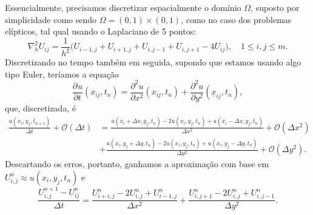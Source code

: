 \documentclass[../differential_methods.tex]{subfiles}
\begin{document}
Essencialmente, precisamos discretizar espacialmente o domínio \(\Omega \), suposto por simplicidade como sendo \(\Omega = (0, 1) \times (0, 1)\), como no caso dos problemas elípticos, tal qual usando o Laplaciano de 5 pontos:
\[
	\nabla_{h}^{2} U_{ij} = \frac{1}{h^{2}}\biggl(U_{i-1, j} + U_{i+1, j} + U_{i, j-1} + U_{i, j+1} - 4U_{ij}\biggr), \quad 1\leq i, j\leq m.
\]
Discretizando no tempo também em seguida, supondo que estamos usando algo tipo Euler, teríamos a equação
\[
	\frac{\partial^{}u}{\partial t^{}}(x_{ij}, t_{n}) = \frac{\partial^{2}u}{\partial x^{2}}(x_{ij}, t_{n}) + \frac{\partial^{2}u}{\partial y^{2}}(\underline{x}_{ij}, t_{n}),
\]
que, discretizada, é
\begin{align*}
	\frac{u(x_{i}, y_{j}, t_{n+1})}{\Delta t} + \mathcal{O}(\Delta t) & = \frac{u(x_{i}+\Delta x, y_{j}, t_{n}) - 2u(x_{i}, y_{j}, t_{n}) + u(x_{i}-\Delta x, y_{j}, t_{n}) }{\Delta x^{2}} + \mathcal{O}(\Delta x^{2}) \\
	                                                                  & + \frac{u(x_{i}, y_{j}+\Delta y, t_{n}) - 2u(x_{i}, y_{j}, t_{n}) + u(x_{i}, y_{j}-\Delta y, t_{n})}{\Delta y^{2}} + \mathcal{O}(\Delta y^{2}).
\end{align*}
Descartando os erros, portanto, ganhamos a aproximação com base em \(U_{i,j}^{n}\approx u(x_{i}, y_{j}, t_{n})\) e
\[
	\boxed{\frac{U_{i,j}^{n+1}-U_{ij}^{n}}{\Delta t} = \frac{U_{i+i, j}^{n} -2U_{i, j}^{n} + U_{i-1, j}^{n}}{\Delta x^{2}}+ \frac{U_{i, j+1}^{n} - 2U_{i, j}^{n} + U_{i, j-1}^{n}}{\Delta y^{2}}}.
\]
\end{document}

